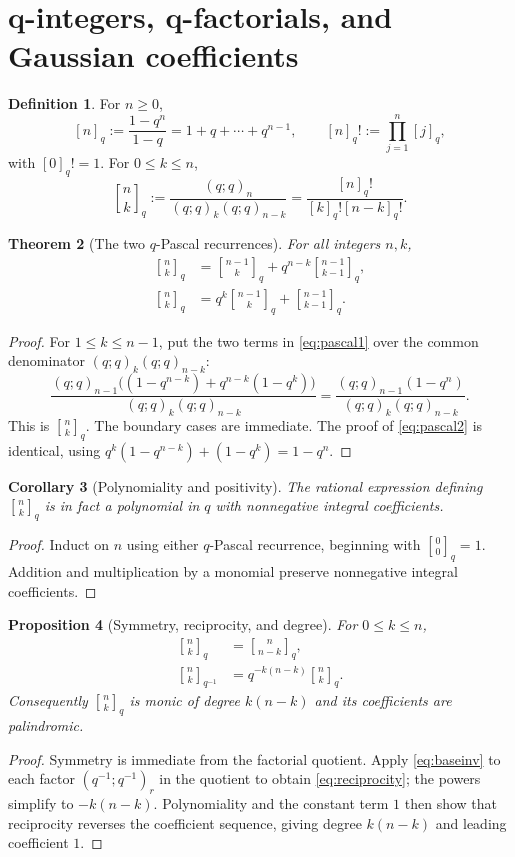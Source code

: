 \documentclass[11pt]{article}
\numberwithin{equation}{section}
\newtheorem{theorem}{Theorem}[section]
\newtheorem{proposition}[theorem]{Proposition}
\newtheorem{corollary}[theorem]{Corollary}
\theoremstyle{definition}
\newtheorem{definition}[theorem]{Definition}
\newcommand{\qbinom}[2]{\genfrac{[}{]}{0pt}{}{#1}{#2}_{q}}
\begin{document}
\section{q-integers, q-factorials, and Gaussian coefficients}
\begin{definition}
For $n\ge0$,
\[
[n]_q:=\frac{1-q^n}{1-q}=1+q+\cdots+q^{n-1},\qquad
[n]_q!:=\prod_{j=1}^n[j]_q,
\]
with $[0]_q!=1$.  For $0\le k\le n$,
\[
\qbinom nk:=\frac{(q;q)_n}{(q;q)_k(q;q)_{n-k}}
=\frac{[n]_q!}{[k]_q![n-k]_q!}.
\]
\end{definition}

\begin{theorem}[The two $q$-Pascal recurrences]
For all integers $n,k$,
\begin{align}
\qbinom nk&=\qbinom{n-1}k+q^{n-k}\qbinom{n-1}{k-1},\label{eq:pascal1}\\
\qbinom nk&=q^k\qbinom{n-1}k+\qbinom{n-1}{k-1}.\label{eq:pascal2}
\end{align}
\end{theorem}
\begin{proof}
For $1\le k\le n-1$, put the two terms in \eqref{eq:pascal1} over the common denominator $(q;q)_k(q;q)_{n-k}$:
\[
\frac{(q;q)_{n-1}\bigl((1-q^{n-k})+q^{n-k}(1-q^k)\bigr)}{(q;q)_k(q;q)_{n-k}}
=\frac{(q;q)_{n-1}(1-q^n)}{(q;q)_k(q;q)_{n-k}}.
\]
This is $\qbinom nk$.  The boundary cases are immediate.  The proof of \eqref{eq:pascal2} is identical, using $q^k(1-q^{n-k})+(1-q^k)=1-q^n$.
\end{proof}

\begin{corollary}[Polynomiality and positivity]
The rational expression defining $\qbinom nk$ is in fact a polynomial in $q$ with nonnegative integral coefficients.
\end{corollary}
\begin{proof}
Induct on $n$ using either $q$-Pascal recurrence, beginning with $\qbinom00=1$.  Addition and multiplication by a monomial preserve nonnegative integral coefficients.
\end{proof}

\begin{proposition}[Symmetry, reciprocity, and degree]
For $0\le k\le n$,
\begin{align}
\qbinom nk&=\qbinom n{n-k},\label{eq:sym}\\
\genfrac{[}{]}{0pt}{}{n}{k}_{q^{-1}}&=q^{-k(n-k)}\qbinom nk.\label{eq:reciprocity}
\end{align}
Consequently $\qbinom nk$ is monic of degree $k(n-k)$ and its coefficients are palindromic.
\end{proposition}
\begin{proof}
Symmetry is immediate from the factorial quotient.  Apply \eqref{eq:baseinv} to each factor $(q^{-1};q^{-1})_r$ in the quotient to obtain \eqref{eq:reciprocity}; the powers simplify to $-k(n-k)$.  Polynomiality and the constant term $1$ then show that reciprocity reverses the coefficient sequence, giving degree $k(n-k)$ and leading coefficient $1$.
\end{proof}
\end{document}
